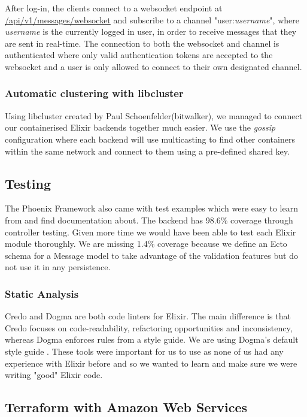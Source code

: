 \documentclass[11pt,a4paper]{report}
\begin{document}
After log-in, the clients connect to a websocket endpoint at \url{/api/v1/messages/websocket} and subscribe to a channel "user:\emph{username}", where \emph{username} is the currently logged in user, in order to receive messages that they are sent in real-time. The connection to both the websocket and channel is authenticated where only valid authentication tokens are accepted to the websocket and a user is only allowed to connect to their own designated channel.

\subsubsection{Automatic clustering with libcluster}

Using libcluster created by Paul Schoenfelder(bitwalker), we managed to connect our containerised Elixir backends together much easier. We use the \textit{gossip} configuration where each backend will use multicasting to find other containers within the same network and connect to them using a pre-defined shared key.

\subsection{Testing}

The Phoenix Framework also came with test examples which were easy to learn from and find documentation about. The backend has 98.6\% coverage through controller testing. Given more time we would have been able to test each Elixir module thoroughly. We are missing 1.4\% coverage because we define an Ecto schema for a Message model to take advantage of the validation features but do not use it in any persistence.

\subsubsection{Static Analysis}

Credo and Dogma are both code linters for Elixir. The main difference is that Credo focuses on code-readability, refactoring opportunities and inconsistency, whereas Dogma enforces rules from a style guide. We are using Dogma's default style guide \cite{website:elixir_dogma_rules}. These tools were important for us to use as none of us had any experience with Elixir before and so we wanted to learn and make sure we were writing "good" Elixir code.

\subsection{Terraform with Amazon Web Services}
\end{document}

